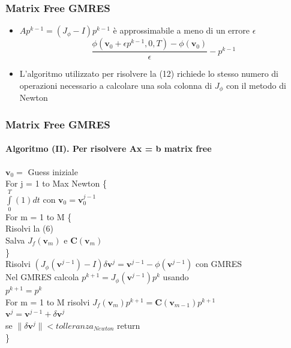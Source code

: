 \documentclass[10pt]{beamer}
\begin{document}
\begin{frame}
\frametitle{Matrix Free GMRES}
\begin{itemize}
\item $Ap^{k-1} = (J_\phi - I)p^{k-1}$ è approssimabile a meno di un errore $\epsilon$ \\\begin{equation} \frac{\phi(\mathbf{v}_0 + \epsilon p^{k-1},0,T) - \phi (\mathbf{v}_0)}{\epsilon} - p^{k-1}
\tag{12}
\end{equation}
\item L'algoritmo utilizzato per risolvere la (12) richiede lo stesso numero di operazioni necessario a calcolare una sola colonna di $J_\phi$ con il metodo di Newton
\end{itemize}
\end{frame}


\begin{frame}
\frametitle{Matrix Free GMRES}\framesubtitle{\textbf{Algoritmo (II)}. Per risolvere Ax = b matrix free}

$\mathbf{v}_0 =$ Guess iniziale \\
 For j = 1 to Max Newton \{ \\
 $\int\limits_{0}^{T} (1) dt$ con $\mathbf{v}_0 = \mathbf{v}_0^{j-1}$ \\
 For m = 1 to M \{ \\
 Risolvi la (6) \\
 Salva $J_f(\mathbf{v}_m)$ e $\mathbf{C}(\mathbf{v}_m)$ \\
 \}\\
 Risolvi $(J_\phi(\mathbf{v}^{j-1}) - I)\delta\mathbf{v}^j = \mathbf{v}^{j-1} - \phi(\mathbf{v}^{j-1})$ con GMRES\\
 Nel GMRES calcola $p^{k+1} = J_\phi(\mathbf{v}^{j-1})p^k$ usando\\
 $p^{k+1} = p^k$ \\
 For m = 1 to M risolvi $J_f(\mathbf{v}_m)p^{k+1} = \mathbf{C}(\mathbf{v}_{m-1})p^{k+1}$ \\
 
 $\mathbf{v}^j = \mathbf{v}^{j-1} + \delta\mathbf{v}^j$ \\
 se $\|\delta\mathbf{v}^j\| < tolleranza_{Newton}$ return\\
 \}

\end{frame}
\end{document}
